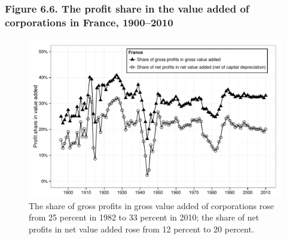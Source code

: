 \documentclass[t]{beamer}\usepackage[]{graphicx}\usepackage[]{color}
\newenvironment{knitrout}{}{} %
\begin{document}
\begin{frame}[label=Figure_6_6]
\frametitle{Figure 6.6. The profit share in the value added of corporations in France, 1900--2010}
\begin{figure}[t]
\begin{minipage}[b]{\textwidth}
\centering
\begin{knitrout}\footnotesize
{}\color{fgcolor}

{\centering \includegraphics[width=1\linewidth]{figures/bw/Figure_6_6} 

}



\end{knitrout}
\caption{The share of gross profits in gross value added of corporations rose from 25 percent in 1982 to 33 percent in 2010; the share of net profits in net value added rose from 12 percent to 20 percent.}
\end{minipage}
\end{figure}
\end{frame}
\end{document}

